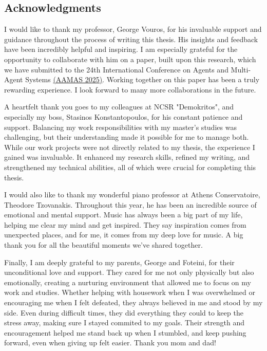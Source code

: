 \subsection*{Acknowledgments}

\begin{flushleft}
    I would like to thank my professor, George Vouros, for his invaluable support and guidance throughout the process of writing this thesis. His insights and feedback have been incredibly helpful and inspiring. I am especially grateful for the opportunity to collaborate with him on a paper, built upon this research, which we have submitted to the 24th International Conference on Agents and Multi-Agent Systems \href{https://aamas2025.org/}{(AAMAS 2025)}. Working together on this paper has been a truly rewarding experience. I look forward to many more collaborations in the future.
\end{flushleft}

\begin{flushleft}
    A heartfelt thank you goes to my colleagues at NCSR "Demokritos", and especially my boss, Stasinos Konstantopoulos, for his constant patience and support. Balancing my work responsibilities with my master’s studies was challenging, but their understanding made it possible for me to manage both. While our work projects were not directly related to my thesis, the experience I gained was invaluable. It enhanced my research skills, refined my writing, and strengthened my technical abilities, all of which were crucial for completing this thesis.
\end{flushleft}

\begin{flushleft}
    I would also like to thank my wonderful piano professor at Athens Conservatoire, Theodore Tzovanakis. Throughout this year, he has been an incredible source of emotional and mental support. Music has always been a big part of my life, helping me clear my mind and get inspired. They say inspiration comes from unexpected places, and for me, it comes from my deep love for music. A big thank you for all the beautiful moments we've shared together.
\end{flushleft}

\begin{flushleft}
    Finally, I am deeply grateful to my parents, George and Foteini, for their unconditional love and support. They cared for me not only physically but also emotionally, creating a nurturing environment that allowed me to focus on my work and studies. Whether helping with housework when I was overwhelmed or encouraging me when I felt defeated, they always believed in me and stood by my side. Even during difficult times, they did everything they could to keep the stress away, making sure I stayed commited to my goals. Their strength and encouragement helped me stand back up when I stumbled, and keep pushing forward, even when giving up felt easier. Thank you mom and dad!
\end{flushleft}

